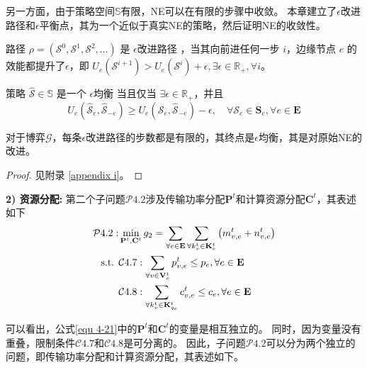 \noindent 另一方面，由于策略空间$\mathbb{S}$有限，NE可以在有限的步骤中收敛。
本章建立了$\epsilon$改进路径和$\epsilon$平衡点\cite{chew2016potential}，其为一个近似于真实NE的策略，然后证明NE的收敛性。
\begin{definition} 
	路径 $\rho=\left(\mathcal{S}^{0}, \mathcal{S}^{1}, \mathcal{S}^{2}, \ldots\right)$ 是 $\epsilon$改进路径 \cite{chew2016potential}，当其向前进任何一步 $i$，边缘节点 $e$ 的效能都提升了$\epsilon$，即 $U_{e}\left(\mathcal{S}^{i+1}\right) > U_{e}\left(\mathcal{S}^{i}\right) + \epsilon, \exists \epsilon \in \mathbb{R}_{+}, \forall i$。
\end{definition}
\begin{definition}
	策略 $\mathcal{\hat{S}} \in \mathbb{S}$ 是一个 $\epsilon$均衡 \cite{chew2016potential} 当且仅当 $\exists \epsilon \in \mathbb{R}_{+}$，并且
	\begin{equation}
		U_{e}\left(\mathcal{\hat{S}}_{e}, \mathcal{\hat{S}}_{-e}\right) \geq U_{e}\left(\mathcal{S}_{e}, \mathcal{\hat{S}}_{-e}\right) - \epsilon, \quad \forall \mathcal{S}_{e} \in \mathbf{S}_{e}, \forall e \in \mathbf{E}
	\end{equation}
\end{definition}
\begin{theorem}
对于博弈$\mathcal{G}$，每条$\epsilon$改进路径的步数都是有限的，其终点是$\epsilon$均衡，其是对原始NE的改进。
\label{theorem 4-3}
\end{theorem}
\begin{proof} 见附录 \ref{appendix i}。
\end{proof}

\textbf{2) 资源分配:} 第二个子问题$\mathcal{P}4.2$涉及传输功率分配$\mathbf{P}^{t}$和计算资源分配$\mathbf{C}^{t}$，其表述如下
\begin{align}
	\mathcal{P}4.2: &\min_{\mathbf{P}^{t}, \mathbf{C}^{t}} g_2= \sum_{ \forall e \in \mathbf{E}} \sum_{\forall k_{v}^{t} \in \mathbf{K}_{e}^{t}} \left( m_{v, e}^{t} +  n_{v, e}^{t} \right) \notag \\
	\text { s.t. }
    &\mathcal{C}4.7: \sum_{\forall v \in \mathbf{V}_{e}^{t}} p_{v, e}^{t} \leq p_{e}, \forall e \in \mathbf{E} \notag \\
    &\mathcal{C}4.8: \sum_{\forall k_{v}^{t} \in {\mathbf{K}_{q_e}^{t} }} c_{v, e}^t \leq c_{e}, \forall e \in \mathbf{E}
\label{equ 4-21}
\end{align}

\noindent 可以看出，公式\ref{equ 4-21}中的$\mathbf{P}^{t}$和$\mathbf{C}^{t}$的变量是相互独立的。
同时，因为变量没有重叠，限制条件$\mathcal{C}4.7$和$\mathcal{C}4.8$是可分离的。
因此，子问题$\mathcal{P}4.2$可以分为两个独立的问题，即传输功率分配和计算资源分配，其表述如下。

